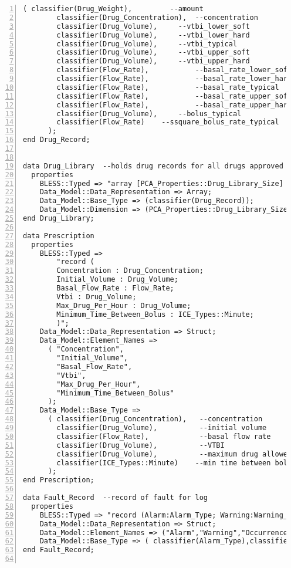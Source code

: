 \begin{lstlisting}[language=aadl, gobble=0, numbers=left, caption={\lstinline{PCA_Types} package}]
      ( classifier(Drug_Weight),         --amount
      	classifier(Drug_Concentration),  --concentration
      	classifier(Drug_Volume),     --vtbi_lower_soft
      	classifier(Drug_Volume),     --vtbi_lower_hard
      	classifier(Drug_Volume),     --vtbi_typical
      	classifier(Drug_Volume),     --vtbi_upper_soft
      	classifier(Drug_Volume),     --vtbi_upper_hard
      	classifier(Flow_Rate),           --basal_rate_lower_soft
      	classifier(Flow_Rate),           --basal_rate_lower_hard
      	classifier(Flow_Rate),           --basal_rate_typical
      	classifier(Flow_Rate),           --basal_rate_upper_soft
      	classifier(Flow_Rate),           --basal_rate_upper_hard
      	classifier(Drug_Volume),     --bolus_typical
      	classifier(Flow_Rate)    --ssquare_bolus_rate_typical
      );
end Drug_Record;


data Drug_Library  --holds drug records for all drugs approved by the hospital pharmacy
  properties
    BLESS::Typed => "array [PCA_Properties::Drug_Library_Size] of PCA_Types::Drug_Record";
    Data_Model::Data_Representation => Array;
    Data_Model::Base_Type => (classifier(Drug_Record));
    Data_Model::Dimension => (PCA_Properties::Drug_Library_Size);
end Drug_Library;
  
data Prescription
  properties
    BLESS::Typed => 
		"record (
		Concentration : Drug_Concentration;
		Initial_Volume : Drug_Volume;
		Basal_Flow_Rate : Flow_Rate;
		Vtbi : Drug_Volume;
		Max_Drug_Per_Hour : Drug_Volume;
		Minimum_Time_Between_Bolus : ICE_Types::Minute;
		)";
    Data_Model::Data_Representation => Struct;
    Data_Model::Element_Names => 
      ( "Concentration",
		"Initial_Volume",
		"Basal_Flow_Rate",
		"Vtbi",
		"Max_Drug_Per_Hour",
		"Minimum_Time_Between_Bolus"
      );
    Data_Model::Base_Type => 
      ( classifier(Drug_Concentration),   --concentration
        classifier(Drug_Volume),          --initial volume
        classifier(Flow_Rate),            --basal flow rate
        classifier(Drug_Volume),          --VTBI
        classifier(Drug_Volume),          --maximum drug allowed per hour
        classifier(ICE_Types::Minute)    --min time between bolus doses        
      );
end Prescription;  
  
data Fault_Record  --record of fault for log
  properties
    BLESS::Typed => "record (Alarm:Alarm_Type; Warning:Warning_Type; Occurrence_Time:BLESS_Types::Time;)";
    Data_Model::Data_Representation => Struct;
    Data_Model::Element_Names => ("Alarm","Warning","Occurrence_Time");
    Data_Model::Base_Type => ( classifier(Alarm_Type),classifier(Warning_Type),classifier(BLESS_Types::Time));
end Fault_Record;  


\end{lstlisting}
